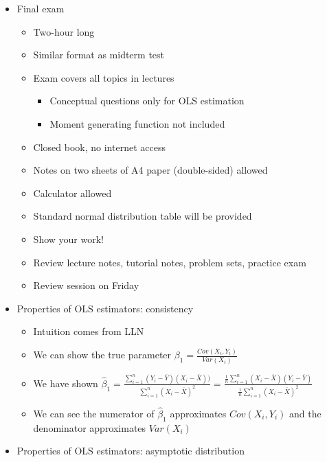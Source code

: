\documentclass{article}
\begin{document}
\begin{itemize}
\subsection{Slide 11}
    \item Final exam
    \begin{itemize}
        \item Two-hour long
        \item Similar format as midterm test
        \item Exam covers all topics in lectures
        \begin{itemize}
            \item Conceptual questions only for OLS estimation
            \item Moment generating function not included
        \end{itemize}
        \item Closed book, no internet access
        \item Notes on two sheets of A4 paper (double-sided) allowed
        \item Calculator allowed
        \item Standard normal distribution table will be provided
        \item Show your work!
        \item Review lecture notes, tutorial notes, problem sets, practice exam
        \item Review session on Friday
    \end{itemize}
    \item Properties of OLS estimators: consistency
    \begin{itemize}
        \item Intuition comes from LLN
        \item We can show the true parameter $\beta_1 = \frac{Cov(X_i,Y_i)}{Var(X_i)}$
        \item We have shown $\hat{\beta}_1 = \frac{\sum_{i=1}^n (Y_i-\overline{Y})(X_i - \overline{X}))}{\sum_{i=1}^n (X_i -\overline{X})^2} = \frac{\frac{1}{n} \sum_{i=1}^n (X_i - \overline{X})(Y_i - \overline{Y})}{\frac{1}{n} \sum_{i=1}^n (X_i - \overline{X})^2}$
        \item We can see the numerator of $\hat{\beta}_1$ approximates $Cov(X_i,Y_i)$ and the denominator approximates $Var(X_i)$
    \end{itemize}
    \item Properties of OLS estimators: asymptotic distribution
    \begin{itemize}

\end{itemize}
\end{itemize}
\end{document}
